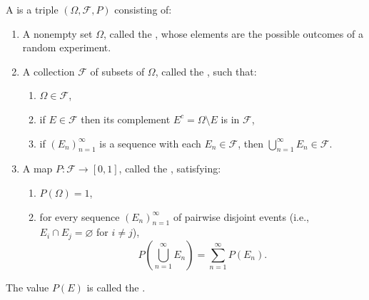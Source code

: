\begin{definition} \label{definition:probability_space}
A  is a triple $(\Omega, \mathcal{F}, P)$ consisting of:

\begin{enumerate}
    \item A nonempty set $\Omega$, called the , whose elements are the possible outcomes of a random experiment.

    \item A collection $\mathcal{F}$ of subsets of $\Omega$, called the , such that:
    \begin{enumerate}
        \item $\Omega \in \mathcal{F}$,
        \item if $E \in \mathcal{F}$ then its complement $E^c = \Omega \setminus E$ is in $\mathcal{F}$,
        \item if $(E_n)_{n=1}^\infty$ is a sequence with each $E_n \in \mathcal{F}$, then $\bigcup_{n=1}^\infty E_n \in \mathcal{F}$.
    \end{enumerate}

    \item A map $P: \mathcal{F} \to [0, 1]$, called the , satisfying:
    \begin{enumerate}
        \item $P(\Omega) = 1$,
        \item for every sequence $(E_n)_{n=1}^\infty$ of pairwise disjoint events (i.e., $E_i \cap E_j = \varnothing$ for $i \neq j$),
        $$P\left(\bigcup_{n=1}^\infty E_n\right) = \sum_{n=1}^\infty P(E_n).$$
    \end{enumerate}
\end{enumerate}

The value $P(E)$ is called the .
\end{definition}
